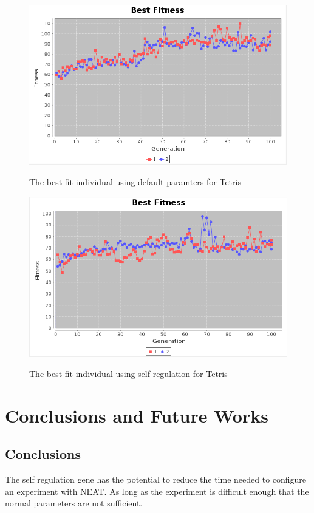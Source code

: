 \documentclass[12pt]{ucthesis} \newif\ifpdf \ifx\pdfoutput\undefined
\begin{document}
\begin{figure}[h!]
  \caption{The best fit individual using default paramters for Tetris}
  \centering
    \includegraphics[width=1\textwidth]{graphstetris/default_best.png}
   \label{fig:default_best_tetris} 
\end{figure}
 
\begin{figure}[h!]
  \caption{The best fit individual using self regulation for Tetris}
  \centering
    \includegraphics[width=1\textwidth]{graphstetris/self_reg_best.png}
   \label{fig:self_best_tetris} 
\end{figure}


\chapter{Conclusions and Future Works}
\section{Conclusions}
The self regulation gene has the potential to reduce the time needed to
configure an experiment with NEAT. As long as the experiment is difficult enough
that the normal parameters are not sufficient.
\end{document}
